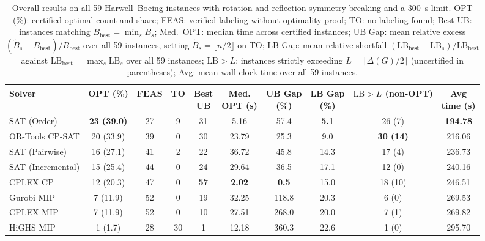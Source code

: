 \documentclass[a4paper,fleqn]{cas-sc}
\begin{document}
\begin{table}[pos=htbp]
\centering
\caption{Overall results on all 59 Harwell--Boeing instances with rotation and reflection symmetry breaking and a 300~s limit. OPT (\%): certified optimal count and share; FEAS: verified labeling without optimality proof; TO: no labeling found; Best UB: instances matching $B_{\text{best}}=\min_s B_s$; Med.\ OPT: median time across certified instances; UB Gap: mean relative excess $(\tilde{B}_s-B_{\text{best}})/B_{\text{best}}$ over all 59 instances, setting $\tilde{B}_s=\lfloor n/2\rfloor$ on TO; LB Gap: mean relative shortfall $(\text{LB}_{\text{best}}-\text{LB}_s)/\text{LB}_{\text{best}}$ against $\text{LB}_{\text{best}}=\max_s\text{LB}_s$ over all 59 instances; $\text{LB}>L$: instances strictly exceeding $L=\lceil\Delta(G)/2\rceil$ (uncertified in parentheses); Avg: mean wall-clock time over all 59 instances.}
\label{tab:overall_summary}
\scriptsize
\setlength{\tabcolsep}{3.2pt}
\begin{tabular*}{\textwidth}{@{\extracolsep{\fill}}lccccccccc@{}}
\toprule
\textbf{Solver} & \textbf{OPT (\%)} & \textbf{FEAS} & \textbf{TO} & \makecell{\textbf{Best}\\\textbf{UB}} & \makecell{\textbf{Med.}\\\textbf{OPT (s)}} & \makecell{\textbf{UB Gap}\\\textbf{(\%)}} & \makecell{\textbf{LB Gap}\\\textbf{(\%)}} & \makecell{\textbf{$\text{LB}>L$}\\\textbf{(non-OPT)}} & \makecell{\textbf{Avg}\\\textbf{time (s)}} \\
\midrule
SAT (Order) & \textbf{23 (39.0)} & 27 & 9 & 31 & 5.16 & 57.4 & \textbf{5.1} & 26 (7) & \textbf{194.78} \\
OR-Tools CP-SAT & 20 (33.9) & 39 & 0 & 30 & 23.79 & 25.3 & 9.0 & \textbf{30 (14)} & 216.06 \\
SAT (Pairwise) & 16 (27.1) & 41 & 2 & 22 & 36.72 & 45.8 & 14.3 & 17 (4) & 236.73 \\
SAT (Incremental) & 15 (25.4) & 44 & 0 & 24 & 29.64 & 36.5 & 17.1 & 12 (0) & 240.16 \\
CPLEX CP & 12 (20.3) & 47 & 0 & \textbf{57} & \textbf{2.02} & \textbf{0.5} & 15.0 & 18 (10) & 246.51 \\
Gurobi MIP & 7 (11.9) & 52 & 0 & 19 & 32.25 & 118.8 & 20.3 & 6 (0) & 269.53 \\
CPLEX MIP & 7 (11.9) & 52 & 0 & 10 & 27.51 & 268.0 & 20.0 & 7 (1) & 269.82 \\
HiGHS MIP & 1 (1.7) & 28 & 30 & 1 & 12.18 & 360.3 & 22.6 & 1 (0) & 295.70 \\
\bottomrule
\end{tabular*}
\end{table}
\end{document}
